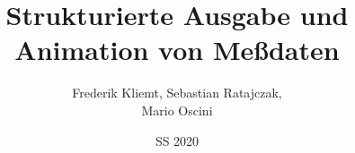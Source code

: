 \date[20s]{SS 2020}

\title[s20-pmp-team08]{Strukturierte Ausgabe und Animation von Meßdaten}

\author[team08]{Frederik Kliemt, Sebastian Ratajczak,\\ Mario Oscini}

